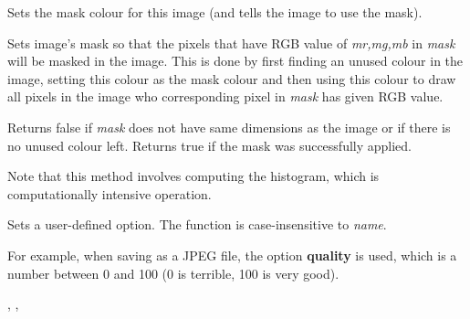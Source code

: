 Sets the mask colour for this image (and tells the image to use the mask).


\label{wximagesetmaskfromimage}





Sets image's mask so that the pixels that have RGB value of {\it mr,mg,mb}
in {\it mask} will be masked in the image. This is done by first finding an
unused colour in the image, setting this colour as the mask colour and then
using this colour to draw all pixels in the image who corresponding pixel 
in {\it mask} has given RGB value.


Returns false if {\it mask} does not have same dimensions as the image or if
there is no unused colour left. Returns true if the mask was successfully 
applied.


Note that this method involves computing the histogram, which is
computationally intensive operation.


\label{wximagesetoption}



Sets a user-defined option. The function is case-insensitive to {\it name}.

For example, when saving as a JPEG file, the option {\bf quality} is
used, which is a number between 0 and 100 (0 is terrible, 100 is very good).


,\rtfsp
{},\rtfsp
{}


\label{wximagesetpalette}

